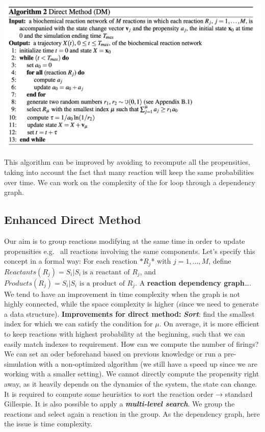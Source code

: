 \includegraphics[width=\textwidth]{direct_method.png}

This algorithm can be improved by avoiding to recompute all the propensities, taking into account the fact that many reaction will keep the same probabilities over time.
We can work on the complexity of the for loop through a dependency graph.

  \subsection{Enhanced Direct Method}
  Our aim is to group reactions modifying at the same time in order to update propensities e.g. ~all reactions involving the same components.
  Let's specify this concept in a formal way: For each reaction $*R_j$* with $j = 1,...,M$, define $Reactants(R_j)={S_i|S_i \ \text{is a reactant of }R_j}$, and $Products(R_j) = {S_i|S_i \text{ is a product of }R_j}$.
  A \textbf{reaction dependency graph}\ldots{}.
  We tend to have an improvement in time complexity when the graph is not highly connected, while the space complexity is higher (since we need to generate a data structure).
  \textbf{Improvements for direct method:} \textbf{\emph{Sort}}: find the smallest index for which we can satisfy the condition for $\mu$.
  On average, it is more efficient to keep reactions with highest probability at the beginning, such that we can easily match indexes to requirement.
  How can we compute the number of firings? We can set an oder beforehand based on previous knowledge or run a pre-simulation with a non-optimized algorithm (we still have a speed up since we are working with a smaller setting).
  We cannot directly compute the propensity right away, as it heavily depends on the dynamics of the system, the state can change.
  It is required to compute some heuristics to sort the reaction order → standard Gillespie.
  It is also possible to apply a \textbf{\emph{multi-level search}}.
  We group the reactions and select again a reaction in the group.
  As the dependency graph, here the issue is time complexity.

